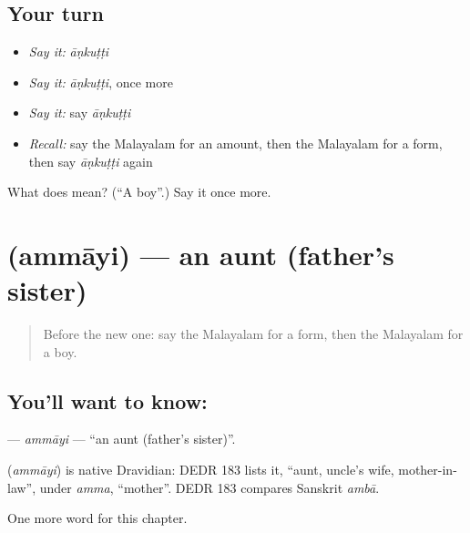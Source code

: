 \subsection*{Your turn}
\begin{itemize}
\raggedright
  \item \emph{Say it:} \emph{āṇkuṭṭi}
  \item \emph{Say it:} \emph{āṇkuṭṭi}, once more
  \item \emph{Say it:} say \emph{āṇkuṭṭi}
  \item \emph{Recall:} say the Malayalam for an amount, then the Malayalam for a form, then say \emph{āṇkuṭṭi} again
\end{itemize}

\begin{tcolorbox}[breakable,colback=teal!4,colframe=teal!35!black,title={Before you move on}]
What does  mean? (\textquotedblleft{}A boy\textquotedblright{}.) Say it once more.
\end{tcolorbox}
\section[\texorpdfstring{\ml{അമ്മായി} (ammāyi)}{അമ്മായി (ammāyi)}]{ (ammāyi) — an aunt (father's sister)}

\label{lesson:ML-C289-ammayi}



\begin{quote}
Before the new one: say the Malayalam for a form, then the Malayalam for a boy.
\end{quote}

\subsection*{You'll want to know: }
\textbf{} — \emph{ammāyi} — \textquotedblleft{}an aunt (father's sister)\textquotedblright{}.

\begin{cousinweb}
\textbf{} (\emph{ammāyi}) is native Dravidian: DEDR 183 lists it, \textquotedblleft{}aunt, uncle's wife, mother-in-law\textquotedblright{}, under \emph{amma}, \textquotedblleft{}mother\textquotedblright{}. DEDR 183 compares Sanskrit \emph{ambā}.
\end{cousinweb}

\begin{grammarlens}[title={What you've built}]
One more word for this chapter.
\end{grammarlens}

